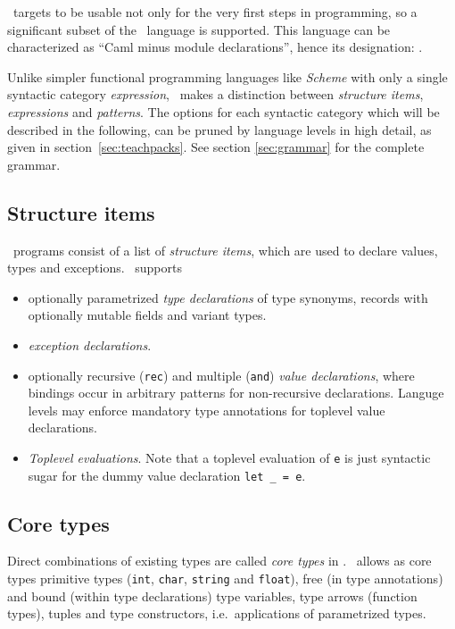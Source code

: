 \easyocaml\ targets to be usable not only for the very first steps in
programming, so a significant subset of the \ocaml\ language is supported.
This language can be characterized as ``Caml minus module declarations'',
hence its designation: \camlm.

Unlike simpler functional programming languages like \textit{Scheme} with only
a single syntactic category \emph{expression}, \ocaml\ makes a distinction
between \emph{structure items}, \emph{expressions} and \emph{patterns}.
The options for each syntactic category which will be described in the
following, can be pruned by language levels in high detail, as given in
section~\ref{sec:teachpacks}.
See section \ref{sec:grammar} for the complete grammar.


\subsection*{Structure items}

\ocaml\ programs consist of a list of \emph{structure items}, which are used to
declare values, types and exceptions.
\easyocaml\ supports
\begin{itemize}
  \item optionally parametrized \emph{type declarations} of type synonyms,
    records with optionally mutable fields and variant types.
  \item \emph{exception declarations}.
  \item optionally recursive (\texttt{rec}) and multiple (\texttt{and})
    \emph{value declarations}, where bindings occur in arbitrary patterns for
    non-recursive declarations.  Languge levels may enforce mandatory type
    annotations for toplevel value declarations.
  \item \emph{Toplevel evaluations}. Note that a toplevel evaluation of
    \texttt{e} is just syntactic sugar for the dummy value declaration
    \texttt{let \_ = e}.
\end{itemize}

\subsection*{Core types}
Direct combinations of existing types are called \emph{core types} in \ocaml.
\easyocaml\ allows as core types primitive types (\texttt{int}, \texttt{char},
\texttt{string} and \texttt{float}), free (in type annotations) and bound
(within type declarations) type variables, type arrows (function types), tuples
and type constructors, i.e.\ applications of parametrized types.


